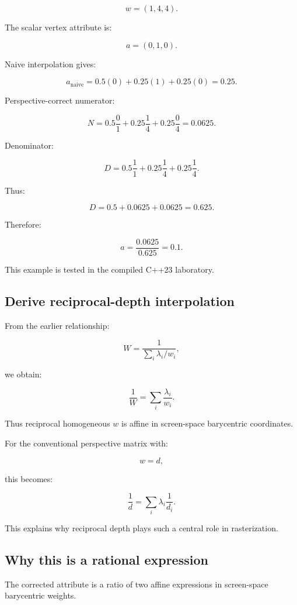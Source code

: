\[
 w=(1,4,4).
\]

The scalar vertex attribute is:

\[
 a=(0,1,0).
\]

Naive interpolation gives:

\[
 a_{\mathrm{naive}} = 0.5(0)+0.25(1)+0.25(0) =\boxed{0.25}.
\]

Perspective-correct numerator:

\[
 N= 0.5\frac01+ 0.25\frac14+ 0.25\frac04 =0.0625.
\]

Denominator:

\[
 D= 0.5\frac11+ 0.25\frac14+ 0.25\frac14.
\]

Thus:

\[
 D=0.5+0.0625+0.0625=0.625.
\]

Therefore:

\[
 \boxed{ a=\frac{0.0625}{0.625}=0.1 }.
\]

This example is tested in the compiled C++23 laboratory.

\subsection{Derive reciprocal-depth interpolation}\label{02-foundations-ii-ch034-derive-reciprocal-depth-interpolation}

From the earlier relationship:

\[
 W=\frac1{\sum_i\lambda_i/w_i},
\]

we obtain:

\[
 \boxed{ \frac1W= \sum_i\frac{\lambda_i}{w_i} }.
\]

Thus reciprocal homogeneous \(w\) is affine in screen-space barycentric coordinates.

For the conventional perspective matrix with:

\[
 w=d,
\]

this becomes:

\[
 \boxed{ \frac1d= \sum_i\lambda_i\frac1{d_i} }.
\]

This explains why reciprocal depth plays such a central role in rasterization.

\subsection{Why this is a rational expression}\label{02-foundations-ii-ch034-why-this-is-a-rational-expression}

The corrected attribute is a ratio of two affine expressions in screen-space barycentric weights.


